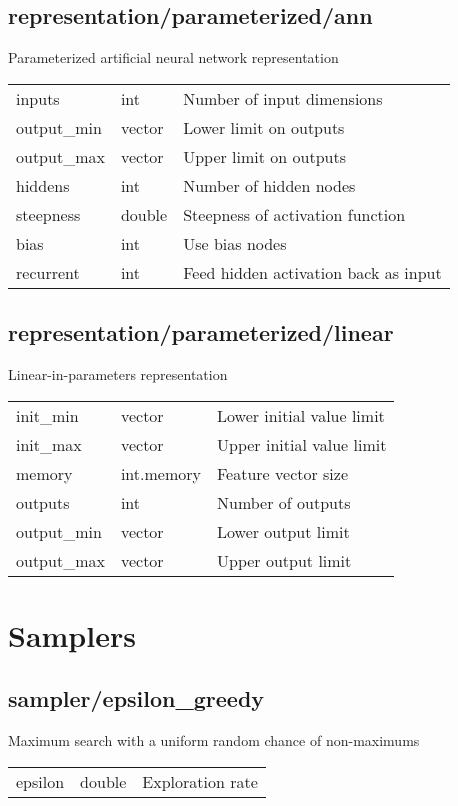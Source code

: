 \subsection{representation/parameterized/ann}
\noindent Parameterized artificial neural network representation\\

\noindent\begin{tabular}{@{}lll@{}}
inputs&int&Number of input dimensions\\
output\_min&vector&Lower limit on outputs\\
output\_max&vector&Upper limit on outputs\\
hiddens&int&Number of hidden nodes\\
steepness&double&Steepness of activation function\\
bias&int&Use bias nodes\\
recurrent&int&Feed hidden activation back as input\\
\end{tabular}
\subsection{representation/parameterized/linear}
\noindent Linear-in-parameters representation\\

\noindent\begin{tabular}{@{}lll@{}}
init\_min&vector&Lower initial value limit\\
init\_max&vector&Upper initial value limit\\
memory&int.memory&Feature vector size\\
outputs&int&Number of outputs\\
output\_min&vector&Lower output limit\\
output\_max&vector&Upper output limit\\
\end{tabular}
\section{Samplers}
\subsection{sampler/epsilon\_greedy}
\noindent Maximum search with a uniform random chance of non-maximums\\

\noindent\begin{tabular}{@{}lll@{}}
epsilon&double&Exploration rate\\
\end{tabular}
